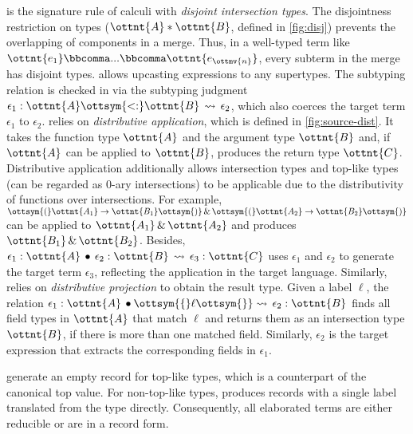  is the signature rule of calculi with \emph{disjoint
intersection types}. The disjointness restriction on types ($\ottnt{A}  *  \ottnt{B}$, defined
in \autoref{fig:disj}) prevents the overlapping of components in a merge. Thus,
in a well-typed term like $\ottnt{e_{{\mathrm{1}}}} \bbcomma  ...  \bbcomma \ottnt{e_{\ottmv{n}}}$, every subterm in the
merge has disjoint types.  allows upcasting expressions to any
supertypes. The subtyping relation is checked in  via the
subtyping judgment $\epsilon_{{\mathrm{1}}}  :  \ottnt{A}  \ottsym{<:}  \ottnt{B}  \,\rightsquigarrow\,  \epsilon_{{\mathrm{2}}}$, which also coerces the target term
$\epsilon_{{\mathrm{1}}}$ to $\epsilon_{{\mathrm{2}}}$.  relies on \emph{distributive application},
which is defined in \autoref{fig:source-dist}. It takes the
function type $\ottnt{A}$ and the argument type $\ottnt{B}$ and, if $\ottnt{A}$ can be
applied to $\ottnt{B}$, produces the return type $\ottnt{C}$. Distributive application
additionally allows intersection types and top-like types (can be regarded as
0-ary intersections) to be applicable due to the distributivity of functions
over intersections. For example, $\ottsym{(}  \ottnt{A_{{\mathrm{1}}}}  \rightarrow  \ottnt{B_{{\mathrm{1}}}}  \ottsym{)}  \, {\&} \,  \ottsym{(}  \ottnt{A_{{\mathrm{2}}}}  \rightarrow  \ottnt{B_{{\mathrm{2}}}}  \ottsym{)}$ can be applied to
$\ottnt{A_{{\mathrm{1}}}}  \, {\&} \,  \ottnt{A_{{\mathrm{2}}}}$ and produces $\ottnt{B_{{\mathrm{1}}}}  \, {\&} \,  \ottnt{B_{{\mathrm{2}}}}$.  Besides, $ \epsilon_{{\mathrm{1}}}   :   \ottnt{A}  \,\bullet\,  \epsilon_{{\mathrm{2}}}   :   \ottnt{B}   \,\rightsquigarrow\,   \epsilon_{{\mathrm{3}}}   :   \ottnt{C} $
uses $\epsilon_{{\mathrm{1}}}$ and $\epsilon_{{\mathrm{2}}}$ to generate the target term $\epsilon_{{\mathrm{3}}}$, reflecting the
application in the target language.  Similarly,  relies on
\emph{distributive projection} to obtain the result type. Given a label $\ell$,
the relation $ \epsilon_{{\mathrm{1}}}   :   \ottnt{A}  \,\bullet  \ottsym{\{}   \ell   \ottsym{\}}  \! \,\rightsquigarrow\,   \epsilon_{{\mathrm{2}}}   :   \ottnt{B} $ finds all field types in $\ottnt{A}$
that match $\ell$ and returns them as an intersection type $\ottnt{B}$, if there is
more than one matched field. Similarly, $\epsilon_{{\mathrm{2}}}$ is the target expression that
extracts the corresponding fields in $\epsilon_{{\mathrm{1}}}$.

 generate an empty record for top-like
types, which is a counterpart of the canonical top value. For non-top-like
types,  produces records with a single label
translated from the type directly. Consequently, all elaborated terms are either
reducible or are in a record form.


